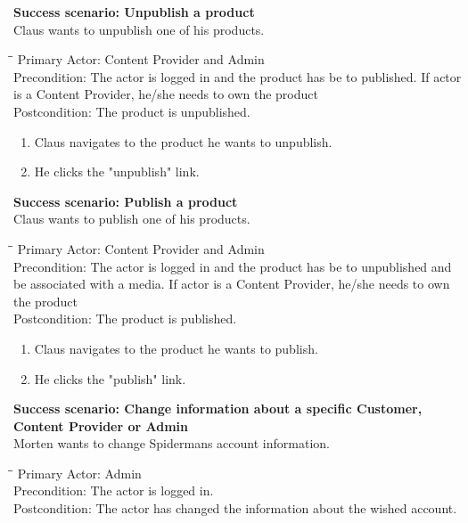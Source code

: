 \vspace{3mm}
\textbf{Success scenario: Unpublish a product} \\
Claus wants to unpublish one of his products.
\begin{tabbing}
\hspace{5mm}\=\hspace{26mm}\=\kill
\>Primary Actor:\> Content Provider and Admin\\
\>Precondition:\> The actor is logged in and the product has be to published. If actor is a Content Provider, he/she needs to own the product\\
\>Postcondition:\> The product is unpublished.
\end{tabbing}
\begin{enumerate} \setlength{\itemsep}{-1mm}
	\item Claus navigates to the product he wants to unpublish.
	\item He clicks the "unpublish" link.
\end{enumerate}
\vspace{3mm}
\textbf{Success scenario: Publish a product} \\
Claus wants to publish one of his products.
\begin{tabbing}
\hspace{5mm}\=\hspace{26mm}\=\kill
\>Primary Actor:\> Content Provider and Admin\\
\>Precondition:\> The actor is logged in and the product has be to unpublished and be associated with a media. If actor is a Content Provider, he/she needs to own the product\\
\>Postcondition:\> The product is published.
\end{tabbing}
\begin{enumerate} \setlength{\itemsep}{-1mm}
	\item Claus navigates to the product he wants to publish.
	\item He clicks the "publish" link.
\end{enumerate}
\vspace{3mm}
\textbf{Success scenario: Change information about a specific Customer, Content Provider or Admin} \\
Morten wants to change Spidermans account information.
\begin{tabbing}
\hspace{5mm}\=\hspace{26mm}\=\kill
\>Primary Actor:\> Admin\\
\>Precondition:\> The actor is logged in.\\
\>Postcondition:\> The actor has changed the information about the wished account.
\end{tabbing}
